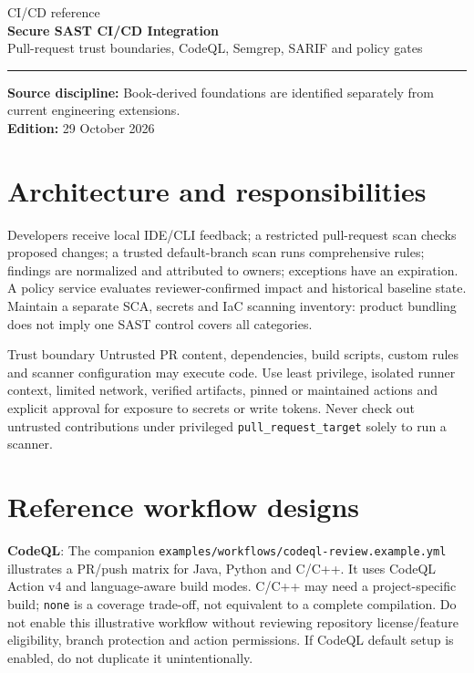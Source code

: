 \documentclass[10pt,letterpaper]{article}
\begin{document}
\hypersetup{pageanchor=false}%
\begin{titlepage}
\vspace*{1.0in}
{\color{bluegray}\Large CI/CD reference}\\[1.0em]
{\color{navy}\Huge\bfseries Secure SAST CI/CD Integration}\\[0.7em]
{\Large Pull-request trust boundaries, CodeQL, Semgrep, SARIF and policy gates}\\[2.0em]
\rule{\linewidth}{1.0pt}
\vfill
\textbf{Source discipline:} Book-derived foundations are identified separately from current engineering extensions.\\
\textbf{Edition:} 29 October 2026
\end{titlepage}\hypersetup{pageanchor=true}
\tableofcontents
\clearpage
\section{Architecture and responsibilities}
Developers receive local IDE/CLI feedback; a restricted pull-request scan checks proposed changes; a trusted default-branch scan runs comprehensive rules; findings are normalized and attributed to owners; exceptions have an expiration. A policy service evaluates reviewer-confirmed impact and historical baseline state. Maintain a separate SCA, secrets and IaC scanning inventory: product bundling does not imply one SAST control covers all categories.
\begin{focusbox}{Trust boundary}
Untrusted PR content, dependencies, build scripts, custom rules and scanner configuration may execute code. Use least privilege, isolated runner context, limited network, verified artifacts, pinned or maintained actions and explicit approval for exposure to secrets or write tokens. Never check out untrusted contributions under privileged \texttt{pull\_request\_target} solely to run a scanner.
\end{focusbox}
\section{Reference workflow designs}
\textbf{CodeQL}: The companion \texttt{examples/workflows/codeql-review.example.yml} illustrates a PR/push matrix for Java, Python and C/C++. It uses CodeQL Action v4 and language-aware build modes. C/C++ may need a project-specific build; \texttt{none} is a coverage trade-off, not equivalent to a complete compilation. Do not enable this illustrative workflow without reviewing repository license/feature eligibility, branch protection and action permissions. If CodeQL default setup is enabled, do not duplicate it unintentionally.
\end{document}
